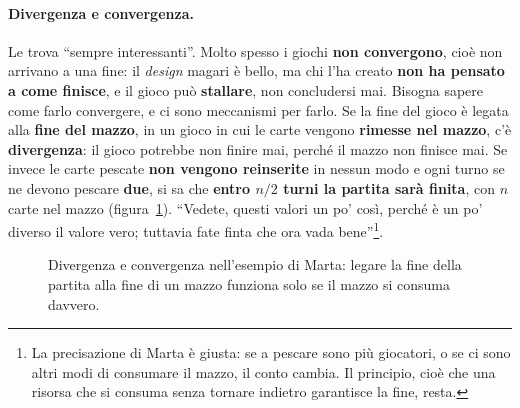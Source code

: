 \paragraph{Divergenza e convergenza.} Le trova ``sempre interessanti''. Molto spesso i giochi
\textbf{non convergono}, cioè non arrivano a una fine: il \emph{design} magari è bello, ma chi
l'ha creato \textbf{non ha pensato a come finisce}, e il gioco può \textbf{stallare}, non
concludersi mai. Bisogna sapere come farlo convergere, e ci sono meccanismi per farlo. Se la
fine del gioco è legata alla \textbf{fine del mazzo}, in un gioco in cui le carte vengono
\textbf{rimesse nel mazzo}, c'è \textbf{divergenza}: il gioco potrebbe non finire mai, perché il
mazzo non finisce mai. Se invece le carte pescate \textbf{non vengono reinserite} in nessun modo
e ogni turno se ne devono pescare \textbf{due}, si sa che \textbf{entro $n/2$ turni la partita
sarà finita}, con $n$ carte nel mazzo (figura~\ref{a14:fig:convergenza}). ``Vedete, questi
valori un po' così, perché è un po' diverso il valore vero; tuttavia fate finta che ora vada
bene''\footnote{La precisazione di Marta è giusta: se a pescare sono più giocatori, o se ci sono
altri modi di consumare il mazzo, il conto cambia. Il principio, cioè che una risorsa che si
consuma senza tornare indietro garantisce la fine, resta.}.

\begin{figure}[htbp]
\centering
{}
\caption{Divergenza e convergenza nell'esempio di Marta: legare la fine della partita alla fine
di un mazzo funziona solo se il mazzo si consuma davvero.}
\label{a14:fig:convergenza}
\end{figure}

